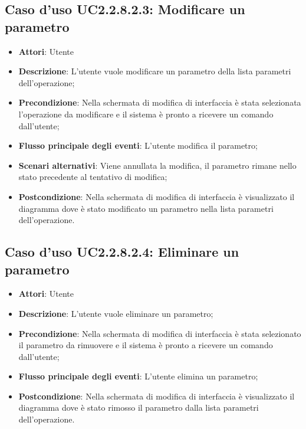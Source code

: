 \documentclass[../AnalisiDeiRequisiti.tex]{subfiles}
\begin{document}
			\subsection{Caso d'uso UC2.2.8.2.3: Modificare un parametro}
			\begin{itemize}
				\item \textbf{Attori}: Utente
				\item \textbf{Descrizione}: L'utente vuole modificare un parametro della lista parametri dell'operazione;
				\item \textbf{Precondizione}: Nella schermata di modifica di interfaccia è stata selezionata l'operazione da modificare e il sistema è pronto a ricevere un comando dall'utente;
				\item \textbf{Flusso principale degli eventi}: L'utente modifica il parametro;
				\item \textbf{Scenari alternativi}: Viene annullata la modifica, il parametro rimane nello stato precedente al tentativo di modifica;
				\item \textbf{Postcondizione}: Nella schermata di modifica di interfaccia è visualizzato il diagramma dove è stato modificato un parametro nella lista parametri dell'operazione.
			\end{itemize}
			\subsection{Caso d'uso UC2.2.8.2.4: Eliminare un parametro}
			\begin{itemize}
				\item \textbf{Attori}: Utente
				\item \textbf{Descrizione}: L'utente vuole eliminare un parametro;
				\item \textbf{Precondizione}: Nella schermata di modifica di interfaccia è stata selezionato il parametro da rimuovere e il sistema è pronto a ricevere un comando dall'utente;
				\item \textbf{Flusso principale degli eventi}: L'utente elimina un parametro;
				\item \textbf{Postcondizione}: Nella schermata di modifica di interfaccia è visualizzato il diagramma dove è stato rimosso il parametro dalla lista parametri dell'operazione.	
			\end{itemize}
\end{document}
